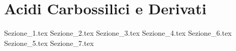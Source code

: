 \chapter{Acidi Carbossilici e Derivati}\label{chap:acCarbossilici}

{Sezione_1.tex} %
{Sezione_2.tex} %
{Sezione_3.tex} %
{Sezione_4.tex} %
{Sezione_6.tex} %
{Sezione_5.tex} %
{Sezione_7.tex} %
